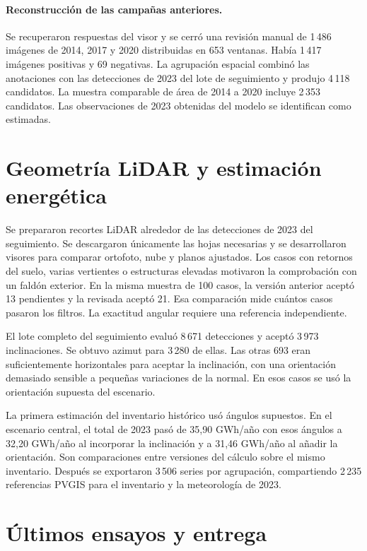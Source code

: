 \documentclass[11pt,a4paper]{article}
\begin{document}
\paragraph{Reconstrucción de las campañas anteriores.}
Se recuperaron respuestas del visor y se cerró una revisión manual de 1\,486 imágenes de 2014, 2017 y 2020 distribuidas en 653 ventanas. Había 1\,417 imágenes positivas y 69 negativas. La agrupación espacial combinó las anotaciones con las detecciones de 2023 del lote de seguimiento y produjo 4\,118 candidatos. La muestra comparable de área de 2014 a 2020 incluye 2\,353 candidatos. Las observaciones de 2023 obtenidas del modelo se identifican como estimadas.

\section{Geometría LiDAR y estimación energética}

Se prepararon recortes LiDAR alrededor de las detecciones de 2023 del seguimiento. Se descargaron únicamente las hojas necesarias y se desarrollaron visores para comparar ortofoto, nube y planos ajustados. Los casos con retornos del suelo, varias vertientes o estructuras elevadas motivaron la comprobación con un faldón exterior. En la misma muestra de 100 casos, la versión anterior aceptó 13 pendientes y la revisada aceptó 21. Esa comparación mide cuántos casos pasaron los filtros. La exactitud angular requiere una referencia independiente.

El lote completo del seguimiento evaluó 8\,671 detecciones y aceptó 3\,973 inclinaciones. Se obtuvo azimut para 3\,280 de ellas. Las otras 693 eran suficientemente horizontales para aceptar la inclinación, con una orientación demasiado sensible a pequeñas variaciones de la normal. En esos casos se usó la orientación supuesta del escenario.

La primera estimación del inventario histórico usó ángulos supuestos. En el escenario central, el total de 2023 pasó de 35,90 GWh/año con esos ángulos a 32,20 GWh/año al incorporar la inclinación y a 31,46 GWh/año al añadir la orientación. Son comparaciones entre versiones del cálculo sobre el mismo inventario. Después se exportaron 3\,506 series por agrupación, compartiendo 2\,235 referencias PVGIS para el inventario y la meteorología de 2023.

\section{Últimos ensayos y entrega}
\end{document}
